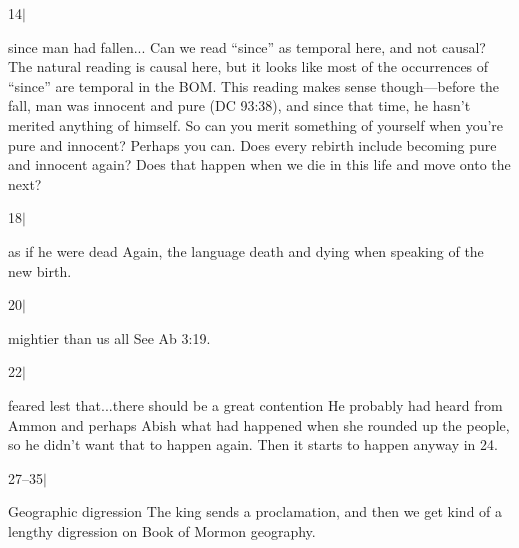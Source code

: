 		\begin{compactdesc}

		\item[14$\vert$]
		\begin{compactdesc}
		\item[since man had fallen...] Can we read ``since'' as temporal here, and not causal? The natural reading is causal here, but it looks like most of the occurrences of ``since'' are temporal in the BOM. This reading makes sense though---before the fall, man was innocent and pure (DC 93:38), and since that time, he hasn't merited anything of himself. So can you merit something of yourself when you're pure and innocent? Perhaps you can. Does every rebirth include becoming pure and innocent again? Does that happen when we die in this life and move onto the next?
		\end{compactdesc}

		\item[18$\vert$]
		\begin{compactdesc}
		\item[as if he were dead] Again, the language death and dying when speaking of the new birth.
		\end{compactdesc}

		\item[20$\vert$]
		\begin{compactdesc}
		\item[mightier than us all] See Ab 3:19. 
		\end{compactdesc}

		\item[22$\vert$]
		\begin{compactdesc}
		\item[feared lest that...there should be a great contention] He probably had heard from Ammon and perhaps Abish what had happened when she rounded up the people, so he didn't want that to happen again. Then it starts to happen anyway in 24.
		\end{compactdesc}

		\item[27--35$\vert$]
		\begin{compactdesc}
		\item[Geographic digression] The king sends a proclamation, and then we get kind of a lengthy digression on Book of Mormon geography.
		\end{compactdesc}

		\end{compactdesc}


